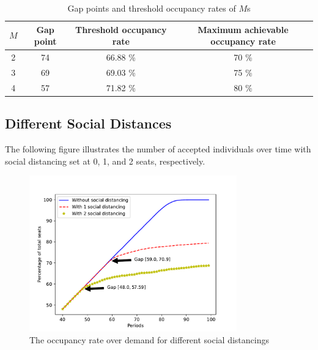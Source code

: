 \begin{table}[ht]
  \centering
  \caption{Gap points and threshold occupancy rates of $M$s}
  \begin{tabular}{c|ccc}
  \hline
   $M$  & Gap point & Threshold occupancy rate & Maximum achievable occupancy rate \\
  \hline
   2 &  74  & 66.88 \% & 70 \% \\
   3 &  69  & 69.03 \% & 75 \% \\
   4 &  57  & 71.82 \% & 80 \% \\ 
   \hline
  \end{tabular}
\end{table}



\subsection*{Different Social Distances}
The following figure illustrates the number of accepted individuals over time with social distancing set at 0, 1, and 2 seats, respectively.

\begin{figure}[h]
  \centering
    \includegraphics[width=0.8\textwidth]{./Figures/distance.pdf}
  \caption{The occupancy rate over demand for different social distancings}
\end{figure}

